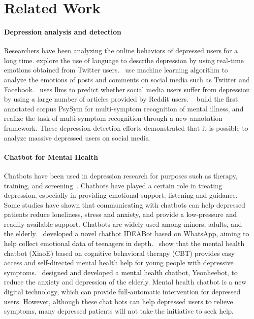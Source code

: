 \section{Related Work}
\label{sec:related}
\paragraph{Depression analysis and detection}
Researchers have been analyzing the online behaviors of depressed users for a long time.
\citet{park2012depressive} explore the use of language to describe depression by using real-time emotions 
obtained from Twitter users.~\citet{saha2021sentiment} use machine learning algorithm to analyze the emotions of posts and comments on social media such as Twitter and Facebook.~\citet{wang2024explainable} uses llms to predict whether social media users suffer from depression by using a large number of articles provided by Reddit users.
~\citet{zhang2022symptom} build the first annotated corpus PsySym for multi-symptom recognition of mental illness, and realize the task of multi-symptom recognition through a new annotation framework.
These depression detection efforts demonstrated that it is possible to analyze massive depressed users on 
social media. 


\paragraph{Chatbot for Mental Health}
Chatbots have been used in depression research for purposes such as therapy, training, and 
screening~\cite{abd2019overview}. Chatbots have played a certain role in treating depression, 
especially in providing emotional support, listening and guidance. Some studies have shown that communicating 
with chatbots can help depressed patients reduce loneliness, stress and anxiety, and provide a low-pressure 
and readily available support. Chatbots are widely used among minors, adults, and the elderly.~\citet{viduani2023assessing} developed a novel chatbot IDEABot based on WhatsApp, 
aiming to help collect emotional data of teenagers in depth.~\citet{he2022mental} show that the mental health chatbot (XiaoE) based on cognitive behavioral therapy (CBT) provides easy access and self-directed mental health help for young people with depressive symptoms.~\citet{ryu2020simple} designed and developed a mental health chatbot, Yeonheebot, to reduce the anxiety and depression of the elderly.
Mental health chatbot is a new digital technology, which can provide full-automatic intervention for depressed users. 
However, although these chat bots can help depressed users to relieve symptoms, many depressed patients will not take the initiative to seek help.



